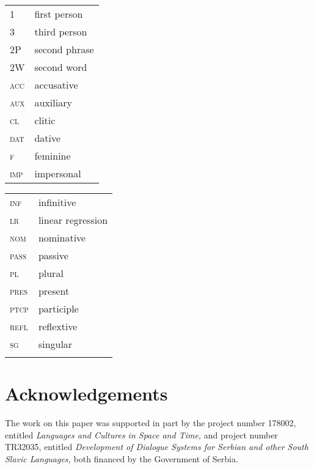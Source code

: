 \documentclass[output=paper,
modfonts,
newtxmath,
hidelinks,
]{langscibook}
\begin{document}
\begin{tabularx}{.5\textwidth}{@{}lQ@{}}
\textsc{1}&first person\\
\textsc{3}&third person\\
2P&second phrase\\
2W&second word\\
\textsc{acc}&accusative\\
\textsc{aux}&auxiliary\\
\textsc{cl}&clitic\\
\textsc{dat}&dative\\
\textsc{f}&feminine\\
\textsc{imp}&impersonal\\
\end{tabularx}%
\begin{tabularx}{.5\textwidth}{@{}lQ@{}}
\textsc{inf}&infinitive\\
\textsc{lr}&linear regression\\
\textsc{nom}&nominative\\
\textsc{pass}&passive\\
\textsc{pl}&plural\\
 \textsc{pres}&present\\
\textsc{ptcp}&participle\\
\textsc{refl}&reflextive\\
\textsc{sg}&singular\\
&\\
\end{tabularx}

\section*{Acknowledgements}

The work on this paper was supported in part by the project number 178002, entitled \textit{Languages and Cultures in Space and Time,} and project number TR32035, entitled \textit{Development of Dialogue Systems for Serbian and other South Slavic Languages,} both financed by the Government of Serbia.
\sloppy
\printbibliography[heading=subbibliography,notkeyword=this]
\end{document}

